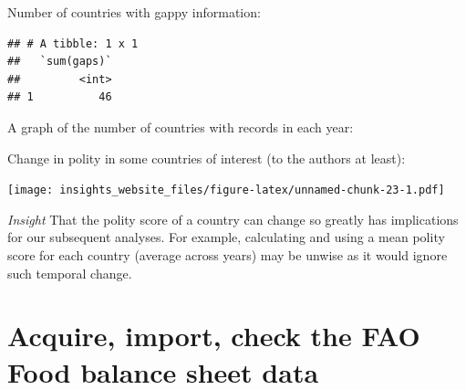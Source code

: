 \documentclass[]{book}
\newenvironment{Shaded}{\begin{snugshade}}{\end{snugshade}}
\newcommand{\DataTypeTok}[1]{\textcolor[rgb]{0.13,0.29,0.53}{#1}}
\newcommand{\KeywordTok}[1]{\textcolor[rgb]{0.13,0.29,0.53}{\textbf{#1}}}
\newcommand{\NormalTok}[1]{#1}
\newcommand{\OperatorTok}[1]{\textcolor[rgb]{0.81,0.36,0.00}{\textbf{#1}}}
\newcommand{\StringTok}[1]{\textcolor[rgb]{0.31,0.60,0.02}{#1}}
\begin{document}
Number of countries with gappy information:

\begin{Shaded}
\end{Shaded}

\begin{verbatim}
## # A tibble: 1 x 1
##   `sum(gaps)`
##         <int>
## 1          46
\end{verbatim}

A graph of the number of countries with records in each year:

Change in polity in some countries of interest (to the authors at least):

\begin{Shaded}
\end{Shaded}

\texttt{[image: insights\_website\_files/figure-latex/unnamed-chunk-23-1.pdf]}

\emph{Insight} That the polity score of a country can change so greatly has implications for our subsequent analyses. For example, calculating and using a mean polity score for each country (average across years) may be unwise as it would ignore such temporal change.

\hypertarget{acquire-import-check-the-fao-food-balance-sheet-data}{%
\section{Acquire, import, check the FAO Food balance sheet data}\label{acquire-import-check-the-fao-food-balance-sheet-data}}
\end{document}
